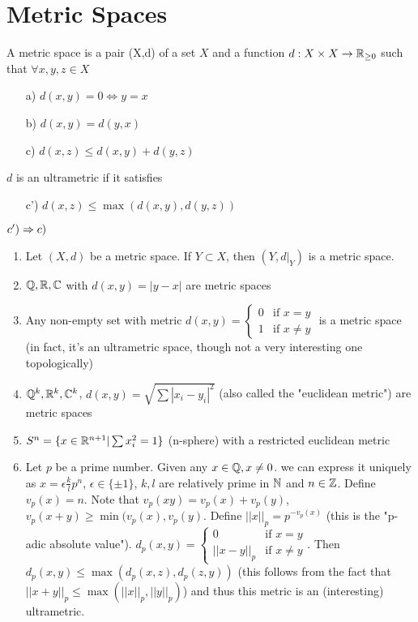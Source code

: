 \section*{Metric Spaces}
\begin{mydef}
A metric space is a pair (X,d) of a set $X$ and a function $d: X\times X\to\mathbb{R}_{\geq 0}$ such that $\forall x,y,z \in X$
\begin{enumerate}
\item[a)] $d(x,y) = 0 \Leftrightarrow y=x$
\item[b)] $d(x,y) = d(y,x)$
\item[c)] $d(x,z) \leq d(x,y) + d(y,z)$
\end{enumerate}
$d$ is an ultrametric if it satisfies
\begin{enumerate}
\item[c')] $d(x,z) \leq \max(d(x,y),d(y,z))$
\end{enumerate}
 $c')\Rightarrow c)$
\end{mydef}
\begin{example}
\begin{enumerate}[start=0]
\item Let $(X,d)$ be a metric space. If $Y\subset X$, then $(Y,d|_Y)$ is a metric space.
\item $\mathbb{Q},\mathbb{R},\mathbb{C}$ with $d(x,y)=|y-x|$ are metric spaces
\item Any non-empty set with metric $d(x,y)=\begin{cases} 0 &\mbox{if } x=y \\ 1 & \mbox{if }  x\neq y \end{cases}$ is a metric space (in fact, it's an ultrametric space, though not a very interesting one topologically)
\item $\mathbb{Q}^k,\mathbb{R}^k,\mathbb{C}^k$, $d(x,y)=\sqrt{\sum|x_i-y_i|^2}$ (also called the "euclidean metric") are metric spaces
\item $S^n=\{x\in\mathbb{R}^{n+1}|\sum x_i^2=1\}$ (n-sphere) with a restricted euclidean metric
\item Let $p$ be a prime number. Given any $x\in\mathbb{Q},x\neq0$. we can express it uniquely as $x=\epsilon \frac{k}{l} p^n$, $\epsilon\in\{\pm 1\}$, $k,l$ are relatively prime in $\mathbb{N}$ and $n\in\mathbb{Z}$. Define $v_p(x)=n$. Note that $v_p(xy)=v_p(x)+v_p(y)$, $v_p(x+y)\geq \min(v_p(x),v_p(y)$. Define $||x||_p=p^{-v_p(x)}$ (this is the "p-adic absolute value"). $d_p(x,y)=\begin{cases} 0 &\mbox{if } x=y \\ ||x-y||_p & \mbox{if }  x\neq y \end{cases}$. Then $d_p(x,y)\leq\max(d_p(x,z),d_p(z,y))$ (this follows from the fact that $||x+y||_p\leq\max(||x||_p,||y||_p)$) and thus this metric is an (interesting) ultrametric.
\end{enumerate}
\end{example}
